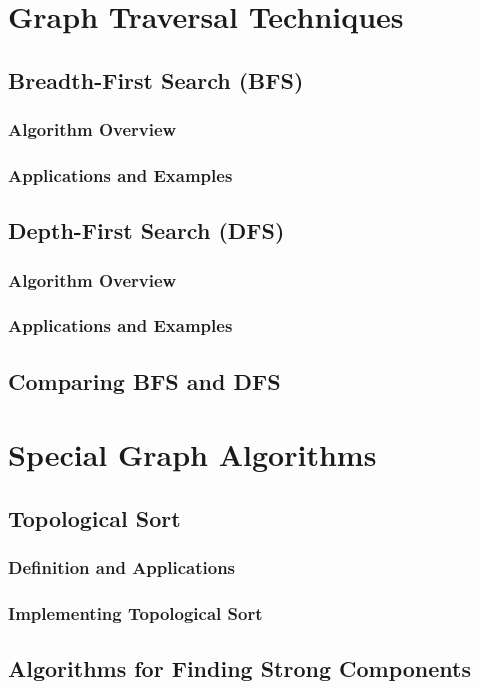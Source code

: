 \documentclass[12pt]{book} %
\begin{document}
\section{Graph Traversal Techniques}
\subsection{Breadth-First Search (BFS)}
\subsubsection{Algorithm Overview}
\subsubsection{Applications and Examples}
\subsection{Depth-First Search (DFS)}
\subsubsection{Algorithm Overview}
\subsubsection{Applications and Examples}
\subsection{Comparing BFS and DFS}

\section{Special Graph Algorithms}
\subsection{Topological Sort}
\subsubsection{Definition and Applications}
\subsubsection{Implementing Topological Sort}
\subsection{Algorithms for Finding Strong Components}
\end{document}

